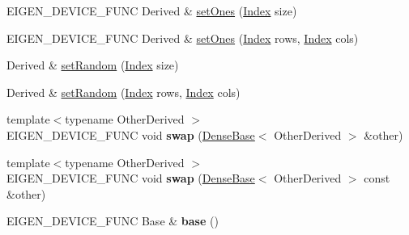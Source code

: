 \begin{DoxyCompactItemize}
\item 
E\+I\+G\+E\+N\+\_\+\+D\+E\+V\+I\+C\+E\+\_\+\+F\+U\+NC Derived \& \hyperlink{class_eigen_1_1_plain_object_base_a2871e88e1feb1cc665fa1f1cc800078b}{set\+Ones} (\hyperlink{namespace_eigen_a62e77e0933482dafde8fe197d9a2cfde}{Index} size)
\item 
E\+I\+G\+E\+N\+\_\+\+D\+E\+V\+I\+C\+E\+\_\+\+F\+U\+NC Derived \& \hyperlink{class_eigen_1_1_plain_object_base_a8e3043e7a51c524c1d1793a3e9826819}{set\+Ones} (\hyperlink{namespace_eigen_a62e77e0933482dafde8fe197d9a2cfde}{Index} rows, \hyperlink{namespace_eigen_a62e77e0933482dafde8fe197d9a2cfde}{Index} cols)
\item 
Derived \& \hyperlink{class_eigen_1_1_plain_object_base_af0e576a0e1aefc9ee346de44cc352ba3}{set\+Random} (\hyperlink{namespace_eigen_a62e77e0933482dafde8fe197d9a2cfde}{Index} size)
\item 
Derived \& \hyperlink{class_eigen_1_1_plain_object_base_a2139f7c1a6711ebd86c4ff6378f5e775}{set\+Random} (\hyperlink{namespace_eigen_a62e77e0933482dafde8fe197d9a2cfde}{Index} rows, \hyperlink{namespace_eigen_a62e77e0933482dafde8fe197d9a2cfde}{Index} cols)
\item 
\mbox{\label{class_eigen_1_1_plain_object_base_aa86254240c534cc55143f38af58c8bdf}} 
{\footnotesize template$<$typename Other\+Derived $>$ }\\E\+I\+G\+E\+N\+\_\+\+D\+E\+V\+I\+C\+E\+\_\+\+F\+U\+NC void {\bfseries swap} (\hyperlink{group___core___module_class_eigen_1_1_dense_base}{Dense\+Base}$<$ Other\+Derived $>$ \&other)
\item 
\mbox{\label{class_eigen_1_1_plain_object_base_a7a975e6a0ec50637ef56e72dc732717e}} 
{\footnotesize template$<$typename Other\+Derived $>$ }\\E\+I\+G\+E\+N\+\_\+\+D\+E\+V\+I\+C\+E\+\_\+\+F\+U\+NC void {\bfseries swap} (\hyperlink{group___core___module_class_eigen_1_1_dense_base}{Dense\+Base}$<$ Other\+Derived $>$ const \&other)
\item 
\mbox{\label{class_eigen_1_1_plain_object_base_a322485a0bc534ee24b8ce5c0df68ab50}} 
E\+I\+G\+E\+N\+\_\+\+D\+E\+V\+I\+C\+E\+\_\+\+F\+U\+NC Base \& {\bfseries base} ()
\item 
\mbox{\label{class_eigen_1_1_plain_object_base_a323e8a05899b309009eab82a52d21e86}} 

\end{DoxyCompactItemize}
